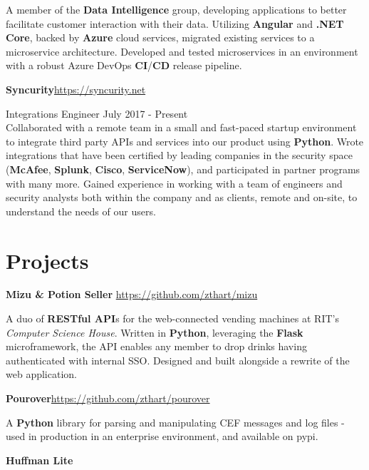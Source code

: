 \documentclass[margin,line]{resume}
\newcommand{\rurl}[1]{\hfill {\footnotesize \url{#1}}}
\begin{document}
\begin{resume}
\begin{asparablank}
	\small A member of the \textbf{Data Intelligence} group, developing applications to better facilitate customer interaction with their data.
	\small Utilizing \textbf{Angular} and \textbf{.NET Core}, backed by \textbf{Azure} cloud services, migrated existing services to a microservice architecture.
	\small Developed and tested microservices in an environment with a robust Azure DevOps \textbf{CI}/\textbf{CD} release pipeline.
	\normalsize
	\\

	\item{\bf Syncurity}\rurl{https://syncurity.net}
	\small \item Integrations Engineer \hfill July 2017 - Present \\
         
        \small Collaborated with a remote team in a small and fast-paced startup environment to integrate third party APIs and services into our product using \textbf{Python}.
        \small Wrote integrations that have been certified by leading companies in the security space (\textbf{McAfee}, \textbf{Splunk}, \textbf{Cisco}, \textbf{ServiceNow}), and participated in partner programs with many more.
        \small Gained experience in working with a team of engineers and security analysts both within the company and as clients, remote and on-site, to understand the needs of our users.
	\end{asparablank}

\section{\mysidestyle Projects}
	\begin{asparablank}
        \item {\bf Mizu \& Potion Seller } \rurl{https://github.com/zthart/mizu}

        \small A duo of \textbf{RESTful API}s for the web-connected vending machines at RIT's 
        \textit{Computer Science House}. Written in \textbf{Python}, leveraging the \textbf{Flask} microframework, 
        the API enables any member to drop drinks having authenticated with internal SSO. Designed and built 
        alongside a rewrite of the web application.
        \\
		\item {\bf Pourover}\rurl{https://github.com/zthart/pourover}

		\small A \textbf{Python} library for parsing and manipulating CEF messages and log files - used in production in 
        an enterprise environment, and available on pypi.
		\normalsize
		\\
		\item {\bf Huffman Lite}


\end{asparablank}
\end{resume}
\end{document}
